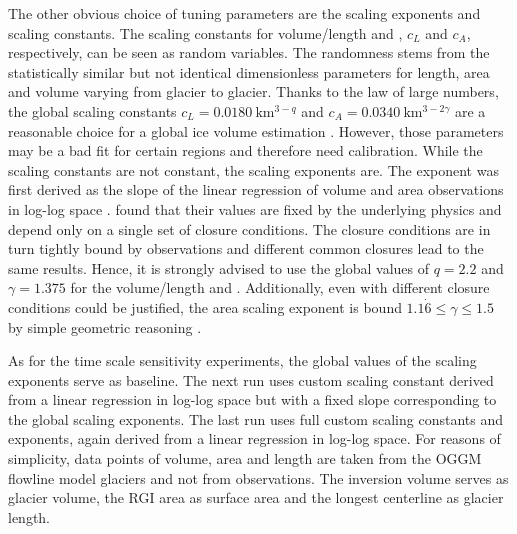         The other obvious choice of tuning parameters are the scaling exponents and scaling constants. The scaling constants for volume/length and \vas{}, $c_L$ and $c_A$, respectively, can be seen as random variables. The randomness stems from the statistically similar but not identical dimensionless parameters for length, area and volume  varying from glacier to glacier. Thanks to the law of large numbers, the global scaling constants $c_L = \SI{0.0180}{\kilo\meter^{3-q}}$ and $c_A = \SI{0.0340}{\kilo\meter^{3-2\gamma}}$ are a reasonable choice for a global ice volume estimation \citep{Bahr2015}. However, those parameters may be a bad fit for certain regions and therefore need calibration.
        While the scaling constants are not constant, the scaling exponents are. The \vas{} exponent was first derived as the slope of the linear regression of volume and area observations in log-log space \citep[e.g.,][]{Chen1990}. \citet{Bahr1997b} found that their values are fixed by the underlying physics and depend only on a single set of closure conditions. The closure conditions are in turn tightly bound by observations and different common closures lead to the same results. Hence, it is strongly advised to use the global values of $q = 2.2$ and $\gamma = 1.375$  for the volume/length and \vas{}. Additionally, even with different closure conditions could be justified, the area scaling exponent is bound $1.1\dot{6} \leq \gamma \leq 1.5$ by simple geometric reasoning \citep[Section 8.2]{Bahr2015}. 

        As for the time scale sensitivity experiments, the global values of the scaling exponents serve as baseline. The next run uses custom scaling constant derived from a linear regression in log-log space but with a fixed slope corresponding to the global scaling exponents. The last run uses full custom scaling constants and exponents, again derived from a linear regression in log-log space. For reasons of simplicity, data points of volume, area and length are taken from the OGGM flowline model glaciers and not from observations. The inversion volume serves as glacier volume, the RGI area as surface area and the longest centerline as glacier length.
        
